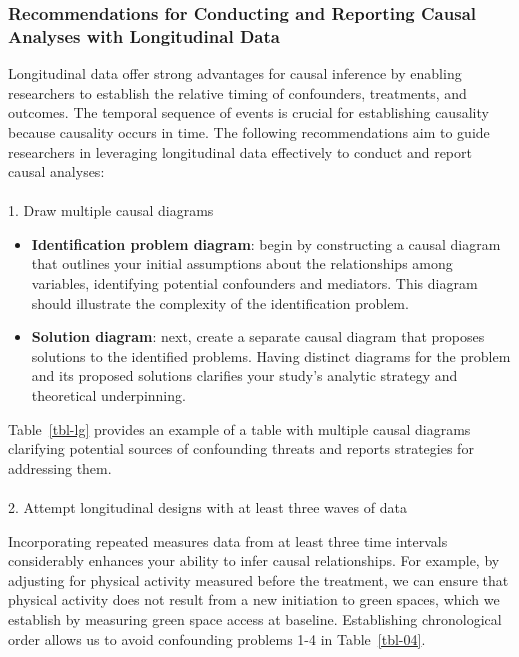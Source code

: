 \documentclass[
  singlecolumn]{article}
\makeatletter
\let\oldparagraph\paragraph
\renewcommand{\paragraph}{
    \@ifstar
      \xxxParagraphStar
      \xxxParagraphNoStar
  }
\newcommand{\xxxParagraphStar}[1]{\oldparagraph*{#1}\mbox{}}
\newcommand{\xxxParagraphNoStar}[1]{\oldparagraph{#1}\mbox{}}
\providecommand{\tightlist}{%
  \setlength{\itemsep}{0pt}\setlength{\parskip}{0pt}}\usepackage{longtable,booktabs,array}
\makeatother
\begin{document}
\subsubsection{Recommendations for Conducting and Reporting Causal
Analyses with Longitudinal
Data}\label{recommendations-for-conducting-and-reporting-causal-analyses-with-longitudinal-data}

Longitudinal data offer strong advantages for causal inference by
enabling researchers to establish the relative timing of confounders,
treatments, and outcomes. The temporal sequence of events is crucial for
establishing causality because causality occurs in time. The following
recommendations aim to guide researchers in leveraging longitudinal data
effectively to conduct and report causal analyses:

\paragraph{1. Draw multiple causal
diagrams}\label{draw-multiple-causal-diagrams-1}

\begin{itemize}
\tightlist
\item
  \textbf{Identification problem diagram}: begin by constructing a
  causal diagram that outlines your initial assumptions about the
  relationships among variables, identifying potential confounders and
  mediators. This diagram should illustrate the complexity of the
  identification problem.
\item
  \textbf{Solution diagram}: next, create a separate causal diagram that
  proposes solutions to the identified problems. Having distinct
  diagrams for the problem and its proposed solutions clarifies your
  study's analytic strategy and theoretical underpinning.
\end{itemize}

Table~\ref{tbl-lg} provides an example of a table with multiple causal
diagrams clarifying potential sources of confounding threats and reports
strategies for addressing them.

\paragraph{2. Attempt longitudinal designs with at least three waves of
data}\label{attempt-longitudinal-designs-with-at-least-three-waves-of-data}

Incorporating repeated measures data from at least three time intervals
considerably enhances your ability to infer causal relationships. For
example, by adjusting for physical activity measured before the
treatment, we can ensure that physical activity does not result from a
new initiation to green spaces, which we establish by measuring green
space access at baseline. Establishing chronological order allows us to
avoid confounding problems 1-4 in Table~\ref{tbl-04}.
\end{document}
